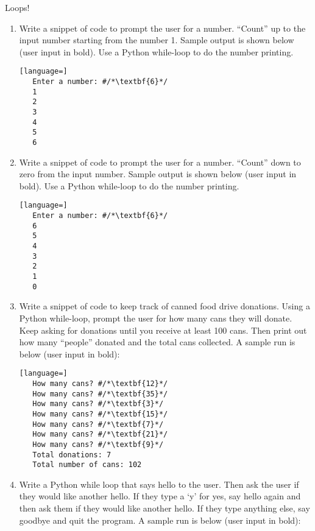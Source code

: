 \documentclass[12pt]{article}
\begin{document}
\begin{center}
   \LARGE Loops!
\end{center}

\begin{enumerate}
   \item Write a snippet of code to prompt the user for a number.  ``Count'' up
      to the input number starting from the number 1.  Sample output is shown
      below (user input in bold).  Use a Python while-loop to do the number
      printing.

      \begin{lstlisting}[language=]
   Enter a number: #/*\textbf{6}*/
   1
   2
   3
   4
   5
   6
      \end{lstlisting}

      \vfill

   \item Write a snippet of code to prompt the user for a number.  ``Count''
      down to zero from the input number.  Sample output is shown below (user
      input in bold).  Use a Python while-loop to do the number printing.

      \begin{lstlisting}[language=]
   Enter a number: #/*\textbf{6}*/
   6
   5
   4
   3
   2
   1
   0
      \end{lstlisting}

      \vfill
      \newpage

   \item Write a snippet of code to keep track of canned food drive donations.
      Using a Python while-loop, prompt the user for how many cans they will
      donate.  Keep asking for donations until you receive at least 100 cans.
      Then print out how many ``people'' donated and the total cans collected.
      A sample run is below (user input in bold):

      \begin{lstlisting}[language=]
   How many cans? #/*\textbf{12}*/
   How many cans? #/*\textbf{35}*/
   How many cans? #/*\textbf{3}*/
   How many cans? #/*\textbf{15}*/
   How many cans? #/*\textbf{7}*/
   How many cans? #/*\textbf{21}*/
   How many cans? #/*\textbf{9}*/
   Total donations: 7
   Total number of cans: 102
      \end{lstlisting}

      \vfill

   \item Write a Python while loop that says hello to the user.  Then ask the
      user if they would like another hello.  If they type a `y' for yes, say
      hello again and then ask them if they would like another hello.  If they
      type anything else, say goodbye and quit the program.  A sample run is
      below (user input in bold):


\end{enumerate}
\end{document}
